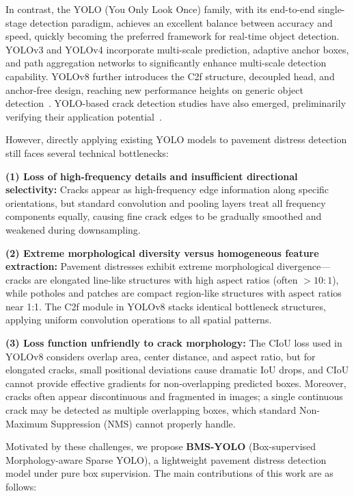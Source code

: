 \documentclass{ieeeaccess}
\begin{document}
{In contrast, the YOLO (You Only Look Once) family, with its end-to-end single-stage detection paradigm, achieves an excellent balance between accuracy and speed, quickly becoming the preferred framework for real-time object detection. YOLOv3 and YOLOv4 incorporate multi-scale prediction, adaptive anchor boxes, and path aggregation networks to significantly enhance multi-scale detection capability. YOLOv8 further introduces the C2f structure, decoupled head, and anchor-free design, reaching new performance heights on generic object detection~\cite{Jocher2023}. YOLO-based crack detection studies have also emerged, preliminarily verifying their application potential~\cite{Wang2024, Adarsh2020}.

However, directly applying existing YOLO models to pavement distress detection still faces several technical bottlenecks:

\textbf{(1) Loss of high-frequency details and insufficient directional selectivity:} Cracks appear as high-frequency edge information along specific orientations, but standard convolution and pooling layers treat all frequency components equally, causing fine crack edges to be gradually smoothed and weakened during downsampling.

\textbf{(2) Extreme morphological diversity versus homogeneous feature extraction:} Pavement distresses exhibit extreme morphological divergence---cracks are elongated line-like structures with high aspect ratios (often $>10:1$), while potholes and patches are compact region-like structures with aspect ratios near 1:1. The C2f module in YOLOv8 stacks identical bottleneck structures, applying uniform convolution operations to all spatial patterns.

\textbf{(3) Loss function unfriendly to crack morphology:} The CIoU loss used in YOLOv8 considers overlap area, center distance, and aspect ratio, but for elongated cracks, small positional deviations cause dramatic IoU drops, and CIoU cannot provide effective gradients for non-overlapping predicted boxes. Moreover, cracks often appear discontinuous and fragmented in images; a single continuous crack may be detected as multiple overlapping boxes, which standard Non-Maximum Suppression (NMS) cannot properly handle.

Motivated by these challenges, we propose \textbf{BMS-YOLO} (Box-supervised Morphology-aware Sparse YOLO), a lightweight pavement distress detection model under pure box supervision. The main contributions of this work are as follows:

}
\end{document}
